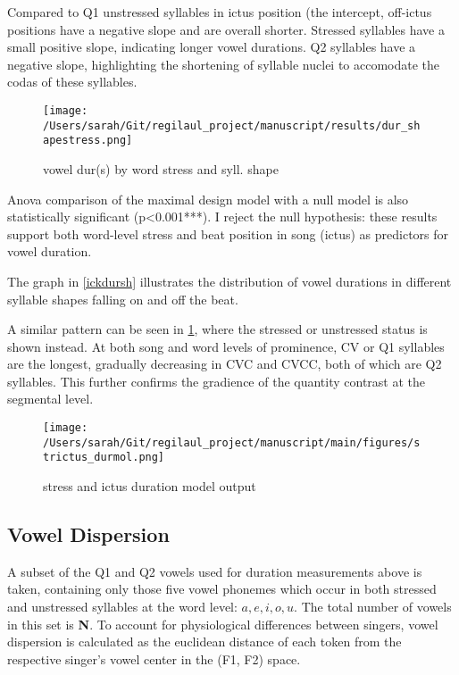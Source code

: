 Compared to Q1 unstressed syllables in ictus position (the intercept,  off-ictus positions have a negative slope and are overall shorter. Stressed syllables have a small positive slope, indicating longer vowel durations. Q2 syllables have a negative slope, highlighting the shortening of syllable nuclei to accomodate the codas of these syllables. 


\begin{figure}[htbp]
\centering
\texttt{[image: /Users/sarah/Git/regilaul\_project/manuscript/results/dur\_shapestress.png]}
\caption{vowel dur(s) by word stress and syll. shape}
\label{strdursh}

\end{figure}
Anova comparison of the maximal design model with a null model is also statistically significant (p<0.001***). I reject the null hypothesis: these results support both word-level stress and beat position in song (ictus) as predictors for vowel duration. 

The graph in \ref{ickdursh} illustrates the distribution of vowel durations in different syllable shapes falling on and off the beat. 

A similar pattern can be seen in \ref{strdursh}, where the stressed or unstressed status is shown instead. At both song and word levels of prominence, CV or Q1 syllables are the longest, gradually decreasing in CVC and CVCC, both of which are Q2 syllables.  This further confirms the gradience of the quantity contrast at the segmental level. 


\begin{figure}[htb]
\begin{center}
\texttt{[image: /Users/sarah/Git/regilaul\_project/manuscript/main/figures/strictus\_durmol.png]}

\caption{stress and ictus duration model output}
\label{strickmdl}
\end{center}
\end{figure}


%

\subsection{Vowel Dispersion}
A subset of the Q1 and Q2 vowels used for duration measurements above is taken,  containing only those five vowel phonemes which occur in both stressed and unstressed syllables at the word level: \(a, e, i, o, u\). The total number of vowels in this set is {\bf N}.
To account for physiological differences between singers, vowel dispersion is calculated as the euclidean distance of each token from the respective singer's vowel center in the (F1, F2) space. 


